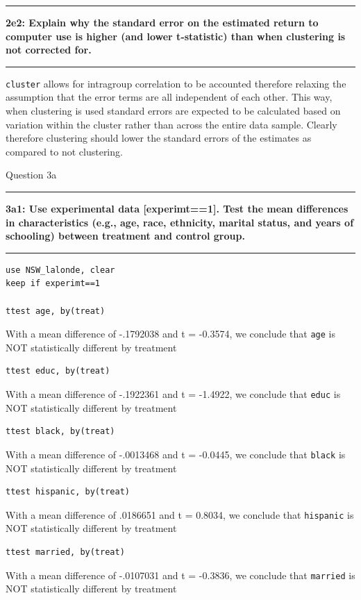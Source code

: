 \documentclass[12pt]{article}
\newcommand\question[2]{\vspace{1em}\hrule\vspace{1em}\textbf{#1: #2}\vspace{1em}\hrule\vspace{1em}}
\begin{document}
\question{2e2}{Explain why the standard error on the estimated return to computer use is higher (and lower t-statistic) than when clustering is not corrected for.}
\verb|cluster| allows for intragroup correlation to be accounted therefore relaxing the assumption that the error terms are all independent of each other. This way, when clustering is used standard errors are expected to be calculated based on variation within the cluster rather than across the entire data sample. Clearly therefore clustering should lower the standard errors of the estimates as compared to not clustering.
\newpage
\begin{center}\LARGE{Question 3a}\end{center}

\question{3a1}{ Use experimental data [experimt==1].  Test the mean differences in characteristics (e.g., age, race, ethnicity, marital status, and years of schooling) between treatment and control group.  }
\begin{lstlisting}
use NSW_lalonde, clear
keep if experimt==1

ttest age, by(treat)
\end{lstlisting}
With a mean difference of -.1792038  and t =   -0.3574, we conclude that \verb|age| is NOT statistically different by treatment

\begin{lstlisting}
ttest educ, by(treat)
\end{lstlisting}
With a mean difference of -.1922361   and t =   -1.4922, we conclude that \verb|educ| is NOT statistically different by treatment

\begin{lstlisting}
ttest black, by(treat)
\end{lstlisting}
With a mean difference of -.0013468    and t =   -0.0445, we conclude that \verb|black| is NOT statistically different by treatment

\begin{lstlisting}
ttest hispanic, by(treat)
\end{lstlisting}
With a mean difference of  .0186651    and t =  0.8034, we conclude that \verb|hispanic| is NOT statistically different by treatment

\begin{lstlisting}
ttest married, by(treat)
\end{lstlisting}
With a mean difference of  -.0107031 and t = -0.3836, we conclude that \verb|married| is NOT statistically different by treatment
\end{document}
